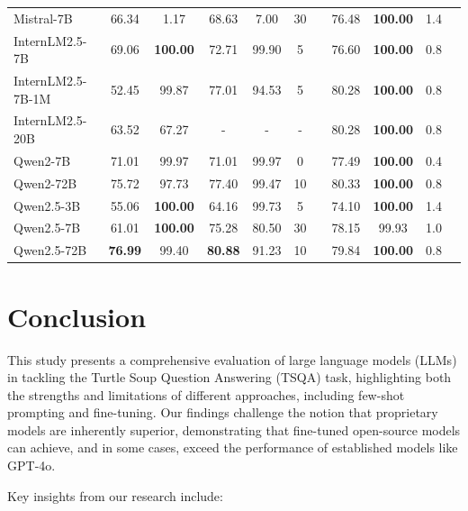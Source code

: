 \documentclass[conference]{IEEEtran}
\begin{document}
\begin{table}[htbp]
{\begin{tabular}{lcccccccccc}
Mistral-7B & 66.34 & 1.17 & 68.63 & 7.00 & 30 & & 76.48 & \textbf{100.00} & 1.4 & \\
InternLM2.5-7B & 69.06 & \textbf{100.00} & 72.71 & 99.90 & 5 & & 76.60 & \textbf{100.00} & 0.8 & \\
InternLM2.5-7B-1M & 52.45 & 99.87 & 77.01 & 94.53 & 5 & & 80.28 & \textbf{100.00} & 0.8 & \\
InternLM2.5-20B & 63.52 & 67.27 & - & - & - & & 80.28 & \textbf{100.00} & 0.8 & \\
Qwen2-7B & 71.01 & 99.97 & 71.01 & 99.97 & 0 & & 77.49 & \textbf{100.00} & 0.4 & \\
Qwen2-72B & 75.72 & 97.73 & 77.40 & 99.47 & 10 & & 80.33 & \textbf{100.00} & 0.8 & \\
Qwen2.5-3B & 55.06 & \textbf{100.00} & 64.16 & 99.73 & 5 & & 74.10 & \textbf{100.00} & 1.4 & \\
Qwen2.5-7B & 61.01 & \textbf{100.00} & 75.28 & 80.50 & 30 & & 78.15 & 99.93 & 1.0 & \\
Qwen2.5-72B & \textbf{76.99} & 99.40 & \textbf{80.88} & 91.23 & 10 & & 79.84 & \textbf{100.00} & 0.8 & \\
\hline
\end{tabular}
}
\end{table}

\section{Conclusion}

This study presents a comprehensive evaluation of large language models (LLMs) in tackling the Turtle Soup Question Answering (TSQA) task, highlighting both the strengths and limitations of different approaches, including few-shot prompting and fine-tuning. Our findings challenge the notion that proprietary models are inherently superior, demonstrating that fine-tuned open-source models can achieve, and in some cases, exceed the performance of established models like GPT-4o.

Key insights from our research include:
\end{document}
